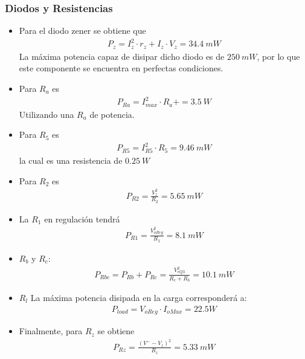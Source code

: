 \subsubsection{Diodos y Resistencias}
\begin{itemize}
	\item Para el diodo zener se obtiene que
	\begin{align}
		P_{z}=I_{z}^2\cdot r_z+I_z \cdot V_z = 34.4 \ mW
	\end{align}
	La máxima potencia capaz de disipar dicho diodo es de $250 \ mW$, por lo que este componente se encuentra en perfectas condiciones.

	\item Para $R_a$ es 
	\begin{align}
		P_{Ra}=I_{max}^2\cdot R_a+ = 3.5 \ W
	\end{align}
	Utilizando una $R_a$ de potencia.

	\item Para $R_5$ es
	\begin{align}
		P_{R5}=I_{R5}^2\cdot R_5 = 9.46 \ mW
	\end{align}
	la cual es una resistencia de $0.25 \ W$

	\item Para $R_2$ es
	\begin{align}
		P_{R2}=\frac{V_z^2}{R_2} = 5.65 \ mW
	\end{align}
	\item La $R_1$ en regulación tendrá 
	\begin{align}
		P_{R1}=\frac{V_{oReg}^2}{R_1} = 8.1 \ mW
	\end{align}
	\item $R_b$ y $R_c$:
	\begin{align}
		P_{Rbc}=P_{Rb} + P_{Rc}=\frac{V_{eQ3}^2}{R_c+R_b} = 10.1 \ mW
	\end{align}
	\item $R_l$ La máxima potencia disipada en la carga corresponderá a:
	\begin{align}
		P_{load}= V_{oReg}\cdot I_{oMax}=22.5W
	\end{align}
	\item Finalmente, para $R_z$ se obtiene
	\begin{align}
		P_{Rz}=\frac{(V^- - V_z)^2}{R_z} = 5.33 \ mW
	\end{align}
\end{itemize}

